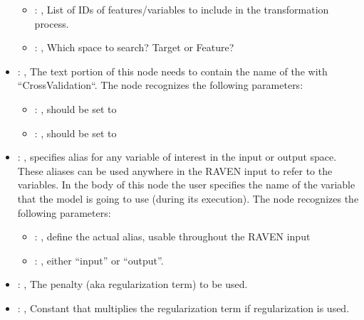 \begin{itemize}
\begin{itemize}
        \item {}: , 
          List of IDs of features/variables to include in the transformation process.

        \item {}: , 
          Which space to search? Target or Feature?
      \end{itemize}

    \item {}: , 
      The text portion of this node needs to contain the name of the  with
               ``CrossValidation``.
      The  node recognizes the following parameters:
        \begin{itemize}
          \item {}: , 
            should be set to 
          \item {}: , 
            should be set to 
      \end{itemize}

    \item {}: , 
      specifies alias for         any variable of interest in the input or output space. These
      aliases can be used anywhere in the RAVEN input to         refer to the variables. In the body
      of this node the user specifies the name of the variable that the model is going to use
      (during its execution).
      The  node recognizes the following parameters:
        \begin{itemize}
          \item {}: , 
            define the actual alias, usable throughout the RAVEN input
          \item {}: , 
            either ``input'' or ``output''.
      \end{itemize}

    \item {}: \xmlDesc{[l2,  l1, elasticnet]}, 
      The penalty (aka regularization term) to be used.

    \item {}: , 
      Constant that multiplies the regularization term if regularization is used.


\end{itemize}

